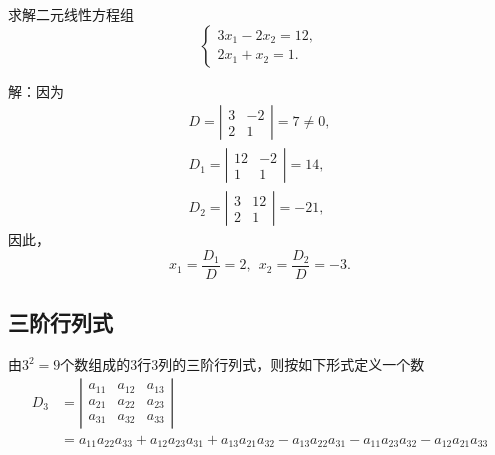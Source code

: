 \documentclass[10pt,a4paper%
tablecaptionabove]{article}
\begin{document}
\begin{CJK}{UTF8}{gkai}
  \begin{li}
    求解二元线性方程组
    $$
    \left\{
      \begin{array}{l}
        3x_1 - 2x_2 = 12, \\[0.2cm]
        2x_1 + x_2  = 1.
      \end{array}
    \right.
    $$
  \end{li}
  解：因为
  $$
  \begin{array}{l}
    D = \left|
    \begin{array}{cc}
      3 & -2 \\
      2 & 1 
    \end{array}
          \right| = 7 \ne 0,\\[0.4cm]
    D_1 = \left|
    \begin{array}{cc}
      12 & -2 \\
      1 & 1 
    \end{array}
          \right| = 14 , \\[0.4cm]
    D_2 = \left|
    \begin{array}{cc}
      3 & 12 \\
      2 & 1 
    \end{array}
          \right| = -21,
  \end{array}
  $$
  因此，
  $$
  x_1=\frac{D_1}{D}=2, \ \ x_2 = \frac{D_2}{D} = -3.
  $$

  \subsection{三阶行列式}
  \begin{dingyi}[三阶行列式]
    由$3^2=9$个数组成的3行3列的三阶行列式，则按如下形式定义一个数
    $$
    \begin{aligned}
      D_3 &= 
      \left|
        \begin{array}{ccc}
          a_{11} & a_{12} & a_{13} \\[0.2cm]
          a_{21} & a_{22} & a_{23} \\[0.2cm]
          a_{31} & a_{32} & a_{33} 
        \end{array}
      \right|
      \\
      &=  a_{11}a_{22}a_{33} + a_{12}a_{23}a_{31} + a_{13}a_{21}a_{32}
      - a_{13}a_{22}a_{31} - a_{11}a_{23}a_{32} - a_{12}a_{21}a_{33}
    \end{aligned}
    $$
  \end{dingyi}


\end{CJK}
\end{document}
